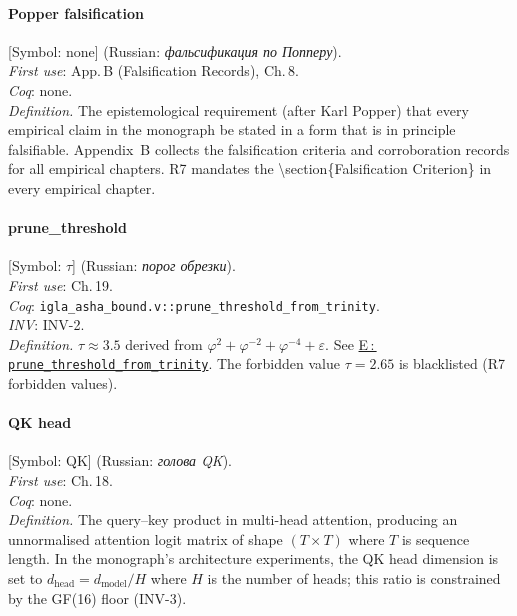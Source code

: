 \paragraph*{\textmd{\textbf{Popper falsification}}}
\label{entry:popper}
[Symbol: none] (Russian: \textit{фальсификация по Попперу}).\\
\textit{First use}: App.\,B (Falsification Records), Ch.\,8.\\
\textit{Coq}: none.\\
\textit{Definition.}
The epistemological requirement (after Karl Popper) that every
empirical claim in the monograph be stated in a form that is
in principle falsifiable.
Appendix~B collects the falsification criteria and corroboration
records for all empirical chapters.
R7 mandates the \textbackslash section\{Falsification Criterion\} in
every empirical chapter.

\paragraph*{\textmd{\textbf{prune\_threshold}}}
\label{entry:prune-threshold}
[Symbol: $\tau$] (Russian: \textit{порог обрезки}).\\
\textit{First use}: Ch.\,19.\\
\textit{Coq}: \texttt{igla\_asha\_bound.v::prune\_threshold\_from\_trinity}.\\
\textit{INV}: INV-2.\\
\textit{Definition.}
$\tau \approx 3.5$ derived from $\varphi^2+\varphi^{-2}+\varphi^{-4}+\varepsilon$.
See \hyperref[entry:coq-prune]{E\,:\,\texttt{prune\_threshold\_from\_trinity}}.
The forbidden value $\tau = 2.65$ is blacklisted (R7 forbidden values).

\paragraph*{\textmd{\textbf{QK head}}}
\label{entry:qk-head}
[Symbol: $\mathrm{QK}$] (Russian: \textit{голова QK}).\\
\textit{First use}: Ch.\,18.\\
\textit{Coq}: none.\\
\textit{Definition.}
The query–key product in multi-head attention, producing an unnormalised
attention logit matrix of shape $(T \times T)$ where $T$ is sequence length.
In the monograph's architecture experiments, the QK head dimension is
set to $d_{\mathrm{head}} = d_{\mathrm{model}}/H$ where $H$ is the number
of heads; this ratio is constrained by the GF(16) floor (INV-3).

